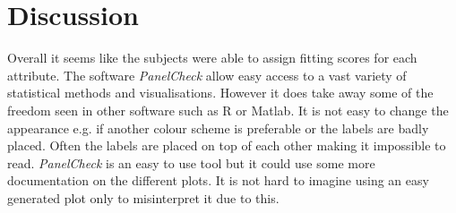 \section*{Discussion}
\label{discussion}
Overall it seems like the subjects were able to assign fitting scores for each attribute. The software  \textit{PanelCheck} allow easy access to a vast variety of statistical methods and visualisations. However it does take away some of the freedom seen in other software such as R or Matlab. It is not easy to change the appearance e.g. if another colour scheme is preferable or the labels are badly placed. Often the labels are placed on top of each other making it impossible to read. \textit{PanelCheck} is an easy to use tool but it could use some more documentation on the different plots. It is not hard to imagine using an easy generated plot only to misinterpret it due to this. 